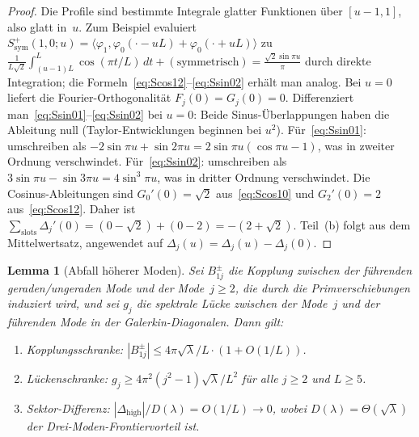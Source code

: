 \documentclass[11pt,a4paper]{article}
\newtheorem{lemma}[lemma]{Lemma}
\theoremstyle{remark}
\theoremstyle{plain}
\begin{document}
\begin{proof}
Die Profile sind bestimmte Integrale glatter Funktionen über $[u-1,1]$, also glatt in~$u$. Zum Beispiel evaluiert $S^+_{\mathrm{sym}}(1,0;u)=\langle\varphi_1,\varphi_0(\cdot-uL)+\varphi_0(\cdot+uL)\rangle$ zu $\frac{1}{L\sqrt{2}}\int_{(u-1)L}^{L}\cos(\pi t/L)\,dt + (\text{symmetrisch}) =\frac{\sqrt{2}\sin\pi u}{\pi}$ durch direkte Integration; die Formeln~\eqref{eq:Scos12}--\eqref{eq:Ssin02} erhält man analog.
Bei $u=0$ liefert die Fourier-Orthogonalität $F_j(0)=G_j(0)=0$.
Differenziert man~\eqref{eq:Ssin01}--\eqref{eq:Ssin02} bei $u=0$: Beide Sinus-Überlappungen haben die Ableitung null (Taylor-Entwicklungen beginnen bei $u^2$).
Für~\eqref{eq:Ssin01}: umschreiben als $-2\sin\pi u+\sin 2\pi u = 2\sin\pi u(\cos\pi u-1)$, was in zweiter Ordnung verschwindet.
Für~\eqref{eq:Ssin02}: umschreiben als $3\sin\pi u-\sin 3\pi u = 4\sin^3\pi u$, was in dritter Ordnung verschwindet.
Die Cosinus-Ableitungen sind $G_0'(0)=\sqrt{2}$ aus~\eqref{eq:Scos10} und $G_2'(0)=2$ aus~\eqref{eq:Scos12}.
Daher ist $\sum_{\mathrm{slots}}\Delta_j'(0)=(0-\sqrt{2})+(0-2)=-(2+\sqrt{2})$.
Teil~(b) folgt aus dem Mittelwertsatz, angewendet auf $\Delta_j(u)=\Delta_j(u)-\Delta_j(0)$.
\end{proof}

\begin{lemma}[Abfall höherer Moden]
\label{lem:higher-mode}
Sei $B_{1j}^\pm$ die Kopplung zwischen der führenden geraden/ungeraden Mode und der Mode~$j\geq 2$, die durch die Primverschiebungen induziert wird, und sei $g_j$ die spektrale Lücke zwischen der Mode~$j$ und der führenden Mode in der Galerkin-Diagonalen. Dann gilt:
\begin{enumerate}[label=(\roman*)]
  \item \emph{Kopplungsschranke:}
  $|B_{1j}^\pm|\leq 4\pi\sqrt\lambda/L\cdot(1+O(1/L))$.
  \item \emph{Lückenschranke:}
  $g_j\geq 4\pi^2(j^2-1)\sqrt\lambda/L^2$ für alle $j\geq 2$ und $L\geq 5$.
  \item \emph{Sektor-Differenz:}
  $|\Delta_{\mathrm{high}}|/D(\lambda)=O(1/L)\to 0$, wobei $D(\lambda)=\Theta(\sqrt\lambda)$ der Drei-Moden-Frontiervorteil ist.
\end{enumerate}
\end{lemma}
\end{document}
